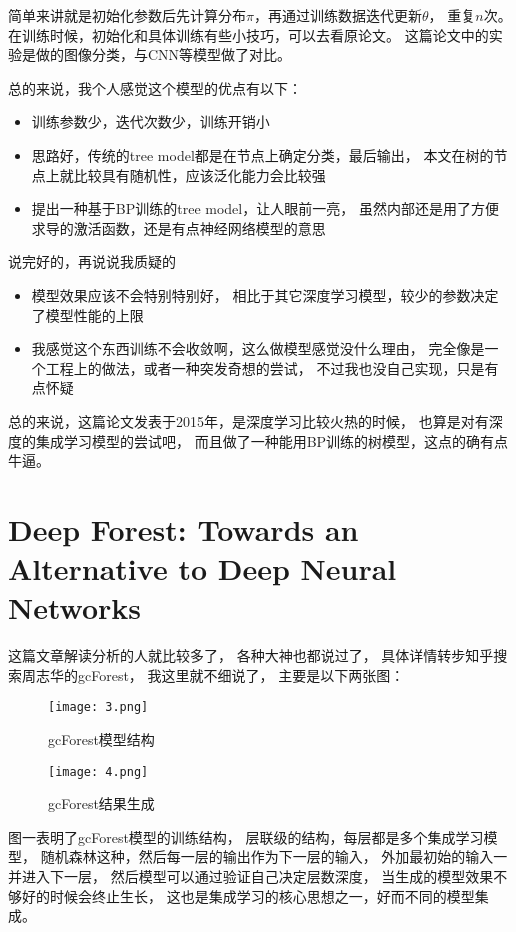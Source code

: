 \documentclass[UTF8]{ctexart}
\begin{document}
简单来讲就是初始化参数后先计算分布$\pi$，再通过训练数据迭代更新$\theta$，
重复$n$次。在训练时候，初始化和具体训练有些小技巧，可以去看原论文。
这篇论文中的实验是做的图像分类，与CNN等模型做了对比。

总的来说，我个人感觉这个模型的优点有以下：
\begin{itemize}
\item 
训练参数少，迭代次数少，训练开销小
\item
思路好，传统的tree model都是在节点上确定分类，最后输出，
本文在树的节点上就比较具有随机性，应该泛化能力会比较强
\item
提出一种基于BP训练的tree model，让人眼前一亮，
虽然内部还是用了方便求导的激活函数，还是有点神经网络模型的意思
\end{itemize}
说完好的，再说说我质疑的
\begin{itemize}
\item
模型效果应该不会特别特别好，
相比于其它深度学习模型，较少的参数决定了模型性能的上限
\item
我感觉这个东西训练不会收敛啊，这么做模型感觉没什么理由，
完全像是一个工程上的做法，或者一种突发奇想的尝试，
不过我也没自己实现，只是有点怀疑
\end{itemize}

总的来说，这篇论文发表于2015年，是深度学习比较火热的时候，
也算是对有深度的集成学习模型的尝试吧，
而且做了一种能用BP训练的树模型，这点的确有点牛逼。


\section{Deep Forest: Towards an Alternative to Deep Neural Networks}
这篇文章解读分析的人就比较多了，
各种大神也都说过了，
具体详情转步知乎搜索周志华的gcForest，
我这里就不细说了，
主要是以下两张图：

\begin{figure}[htbp]
	\small
	\centering
	\texttt{[image: 3.png]}
	\caption{gcForest模型结构}
		\label{1}
\end{figure}

\begin{figure}[htbp]
	\small
	\centering
	\texttt{[image: 4.png]}
	\caption{gcForest结果生成}
		\label{1}
\end{figure}
图一表明了gcForest模型的训练结构，
层联级的结构，每层都是多个集成学习模型，
随机森林这种，然后每一层的输出作为下一层的输入，
外加最初始的输入一并进入下一层，
然后模型可以通过验证自己决定层数深度，
当生成的模型效果不够好的时候会终止生长，
这也是集成学习的核心思想之一，好而不同的模型集成。
\end{document}
